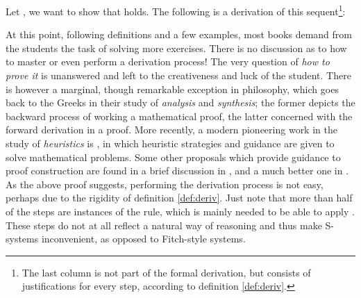 \documentclass[a4paper,UKenglish]{lipics}
\begin{document}
\begin{example}\label{ex:wex}
Let ,  we want to show that  holds. The following is a derivation of this 
sequent\footnote{\noindent The last column is not part of the formal derivation, but 
consists of justifications for every step, according to definition \ref{def:deriv}.}: 

\end{example}


At this point, following definitions and a few examples, most books demand from the students the task of solving more exercises. There is
no discussion as to how to master or even perform a derivation process! The very question of {\em how to prove it} is unanswered and left to the
creativeness and luck of the student. There is however a marginal, though remarkable exception in philosophy, which goes back to the
Greeks in their study of {\em analysis} and {\em synthesis}; the former depicts the backward process of working a mathematical proof, the latter concerned
with the forward derivation in a proof. More recently, a modern pioneering work in the study of {\em heuristics} is \cite{polya}, in which heuristic
strategies and guidance are given to solve mathematical problems. Some other 
proposals which provide guidance to proof construction are found in a brief discussion in \cite{hr}, and a much better one in \cite{mh}.  \\

As the above proof suggests, performing the derivation process is not easy, perhaps due to the rigidity of definition \ref{def:deriv}. Just note that more than half of the steps are instances of the  rule, which is mainly needed to be able to apply .
These steps do not at all reflect a natural way of reasoning and thus make S-systems inconvenient, as opposed to Fitch-style systems. \\
\end{document}
